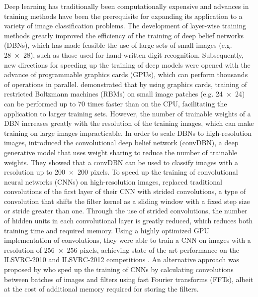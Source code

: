 Deep learning has traditionally been computationally expensive and advances in
training methods have been the prerequisite for expanding its application to a
variety of image classification problems. The development of layer-wise training
methods \citep{Hinton2006b} greatly improved the efficiency of the training of
deep belief networks (DBNs), which has made feasible the use of large sets of
small images (e.g. \num{28x28}), such as those used for hand-written digit
recognition. Subsequently, new directions for speeding up the training of deep
models were opened with the advance of programmable graphics cards (GPUs), which
can perform thousands of operations in parallel.  demonstrated
that by using graphics cards, training of restricted Boltzmann machines (RBMs)
on small image patches (e.g. \num{24x24}) can be performed up to \num{70} times
faster than on the CPU, facilitating the application to larger training sets.
However, the number of trainable weights of a DBN increases greatly with the
resolution of the training images, which can make training on large images
impracticable. In order to scale DBNs to high-resolution images,
\citet{lee2009,lee2011} introduced the convolutional deep belief network
(convDBN), a deep generative model that uses weight sharing to reduce the number
of trainable weights. They showed that a convDBN can be used to classify images
with a resolution up to \num{200x200} pixels. To speed up the training of
convolutional neural networks (CNNs) on high-resolution images,
\citet{Krizhevsky2012} replaced traditional convolutions of the first layer of
their CNN with strided convolutions, a type of convolution that shifts the
filter kernel as a sliding window with a fixed step size or stride greater than
one. Through the use of strided convolutions, the number of hidden units in each
convolutional layer is greatly reduced, which reduces both training time and
required memory. Using a highly optimized GPU implementation of convolutions,
they were able to train a CNN on images with a resolution of \num{256x256}
pixels, achieving state-of-the-art performance on the ILSVRC-2010 and
ILSVRC-2012 competitions \citep{Krizhevsky2012}. An alternative approach was
proposed by \citet{Mathieu2013} who sped up the training of CNNs by calculating
convolutions between batches of images and filters using fast Fourier transforms
(FFTs), albeit at the cost of additional memory required for storing the
filters.

